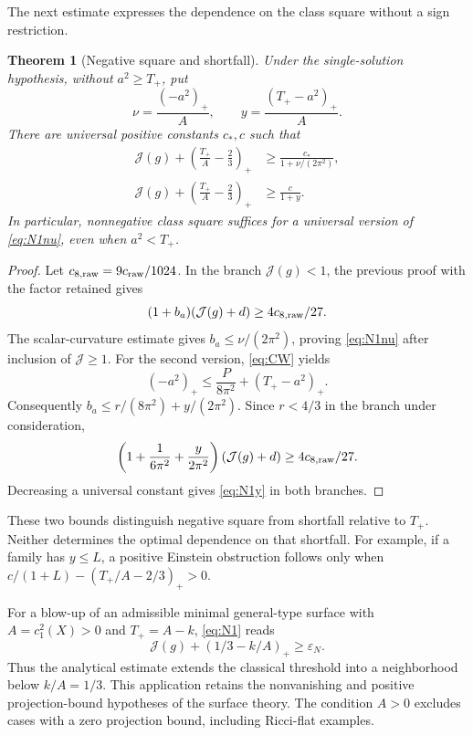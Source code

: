 \documentclass[11pt,a4paper]{article}
\newtheorem{theorem}{Theorem}[section]
\theoremstyle{definition}
\theoremstyle{remark}
\newcommand{\J}{\mathcal J}
\begin{document}
The next estimate expresses the dependence on the class square without a sign restriction.
\begin{theorem}[Negative square and shortfall]\label{thm:shortfall}
Under the single-solution hypothesis, without $a^2\ge T_+$, put
\[
 \nu=\frac{(-a^2)_+}{A},\qquad y=\frac{(T_+-a^2)_+}{A}.
\]
There are universal positive constants $c_*,c$ such that
\begin{align}
 \J(g)+\left(\frac{T_+}{A}-\frac23\right)_+
 &\ge\frac{c_*}{1+\nu/(2\pi^2)},\label{eq:N1nu}\\
 \J(g)+\left(\frac{T_+}{A}-\frac23\right)_+
 &\ge\frac{c}{1+y}.\label{eq:N1y}
\end{align}
In particular, nonnegative class square suffices for a universal version of \eqref{eq:N1nu}, even when $a^2<T_+$.
\end{theorem}
\begin{proof}
Let $c_{8,\rm raw}=9c_{\rm raw}/1024$. In the branch $\J(g)<1$, the previous proof with the factor retained gives
\[
 (1+b_a)(\J(g)+d)\ge4c_{8,\rm raw}/27.
\]
The scalar-curvature estimate gives $b_a\le\nu/(2\pi^2)$, proving \eqref{eq:N1nu} after inclusion of $\J\ge1$. For the second version, \eqref{eq:CW} yields
\[
 (-a^2)_+\le\frac{P}{8\pi^2}+(T_+-a^2)_+.
\]
Consequently $b_a\le r/(8\pi^2)+y/(2\pi^2)$. Since $r<4/3$ in the branch under consideration,
\[
 \left(1+\frac1{6\pi^2}+\frac y{2\pi^2}\right)(\J(g)+d)
 \ge4c_{8,\rm raw}/27.
\]
Decreasing a universal constant gives \eqref{eq:N1y} in both branches.
\end{proof}

These two bounds distinguish negative square from shortfall relative to $T_+$. Neither determines the optimal dependence on that shortfall. For example, if a family has $y\le L$, a positive Einstein obstruction follows only when $c/(1+L)-(T_+/A-2/3)_+>0$.

For a blow-up of an admissible minimal general-type surface with $A=c_1^2(X)>0$ and $T_+=A-k$, \eqref{eq:N1} reads
\[
 \J(g)+(1/3-k/A)_+\ge\varepsilon_N.
\]
Thus the analytical estimate extends the classical threshold into a neighborhood below $k/A=1/3$. This application retains the nonvanishing and positive projection-bound hypotheses of the surface theory. The condition $A>0$ excludes cases with a zero projection bound, including Ricci-flat examples.
\end{document}

